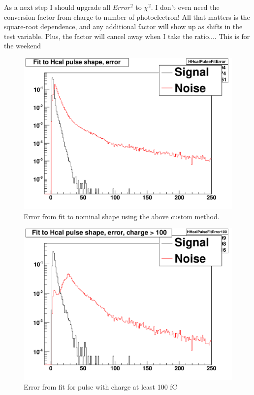 As a next step I should upgrade all $Error^2$ to $\chi^2$.  I don't even need the conversion factor from charge to number of photoelectron!
All that matters is the square-root dependence, and any additional factor will show up as shifts in the test variable.  Plus, the factor will cancel away
when I take the ratio....  This is for the weekend\tweakedtilde

\begin{figure}
\includegraphics[width=120mm]{DailyLog/6275/6275HHcalPulseFitError.pdf}
\caption{Error from fit to nominal shape using the above custom method.}
\label{Figure_6275HHcalPulseFitError}
\end{figure}

\begin{figure}
\includegraphics[width=120mm]{DailyLog/6275/6275HHcalPulseFitError100.pdf}
\caption{Error from fit for pulse with charge at least 100 fC}
\label{Figure_6275HHcalPulseFitError100}
\end{figure}

